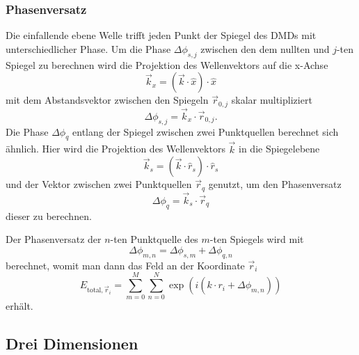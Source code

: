 \subsubsection{Phasenversatz}
Die einfallende ebene Welle trifft jeden Punkt der Spiegel des DMDs mit unterschiedlicher Phase. Um die Phase $\Delta\phi_{s, j}$ zwischen den dem nullten und $j$-ten Spiegel zu berechnen wird die Projektion des Wellenvektors auf die x-Achse
\begin{equation}
    \vec{k}_{x} = \left(\vec{k}\cdot\hat{x}\right)\cdot\hat{x}
\end{equation}
mit dem Abstandsvektor zwischen den Spiegeln $\vec{r}_{0, j}$ skalar multipliziert
\begin{equation}
    \Delta\phi_{s, j} = \vec{k}_x\cdot \vec{r}_{0, j}.
\end{equation}
Die Phase $\Delta\phi_{q}$ entlang der Spiegel zwischen zwei Punktquellen berechnet sich ähnlich. Hier wird die Projektion des Wellenvektors $\vec{k}$ in die Spiegelebene
\begin{equation}
    \vec{k}_{s} = \left(\vec{k}\cdot\hat{r}_{s}\right)\cdot\hat{r}_{s}
\end{equation}
und der Vektor zwischen zwei Punktquellen $\vec{r}_q$ genutzt, um den Phasenversatz
\begin{equation}
    \Delta\phi_{q} = \vec{k}_{s}\cdot \vec{r}_q
\end{equation}
dieser zu berechnen.

Der Phasenversatz der $n$-ten Punktquelle des $m$-ten Spiegels wird mit 
\begin{equation}
    \Delta\phi_{m, n} = \Delta\phi_{s, m} + \Delta\phi_{q, n}
\end{equation}
berechnet, womit man dann das Feld an der Koordinate $\vec{r}_i$
\begin{equation}
    E_{\text{total}, \vec{r}_i}=\sum_{m=0}^{M}\sum_{n=0}^{N}\exp(i(k\cdot r_i+\Delta\phi_{m, n}))
\end{equation}
erhält.

\subsection{Drei Dimensionen}
